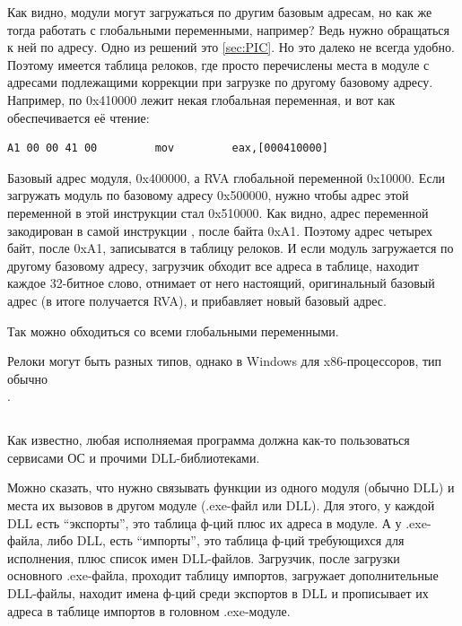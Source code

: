 Как видно, модули могут загружаться по другим базовым адресам, но как же тогда работать с глобальными переменными,
например? Ведь нужно обращаться к ней по адресу. Одно из решений это \PICcode\ref{sec:PIC}. 
Но это далеко не всегда удобно.
Поэтому имеется таблица релоков, где просто перечислены места в модуле с адресами подлежащими коррекции при загрузке
по другому базовому адресу.
Например, по 0x410000 лежит некая глобальная переменная, и вот как обеспечивается её чтение:

\begin{lstlisting}
A1 00 00 41 00         mov         eax,[000410000]
\end{lstlisting}

Базовый адрес модуля, 0x400000, а \ac{RVA} глобальной переменной 0x10000. Если загружать модуль по базовому адресу
0x500000, нужно чтобы адрес этой переменной в этой инструкции стал 0x510000. Как видно, адрес переменной закодирован
в самой инструкции , после байта 0xA1. Поэтому адрес четырех байт, после 0xA1, записыватся в таблицу релоков.
И если модуль загружается по другому базовому адресу, загрузчик обходит все адреса в таблице, находит каждое 32-битное
слово, отнимает от него настоящий, оригинальный базовый адрес (в итоге получается \ac{RVA}), и прибавляет новый базовый адрес.

Так можно обходиться со всеми глобальными переменными.

Релоки могут быть разных типов, однако в Windows для x86-процессоров, тип обычно \\
.

\subsection{}

Как известно, любая исполняемая программа должна как-то пользоваться сервисами ОС и прочими DLL-библиотеками.

Можно сказать, что нужно связывать функции из одного модуля (обычно DLL) и места их вызовов в 
другом модуле (.exe-файл или DLL). 
Для этого, у каждой DLL есть ``экспорты'', это таблица ф-ций плюс их адреса в модуле.
А у .exe-файла, либо DLL, есть ``импорты'', это таблица ф-ций требующихся для исполнения, плюс список имен DLL-файлов.
Загрузчик, после загрузки основного .exe-файла, проходит таблицу импортов, загружает дополнительные DLL-файлы, 
находит имена ф-ций среди экспортов в DLL и прописывает их адреса в таблице импортов в головном .exe-модуле.

